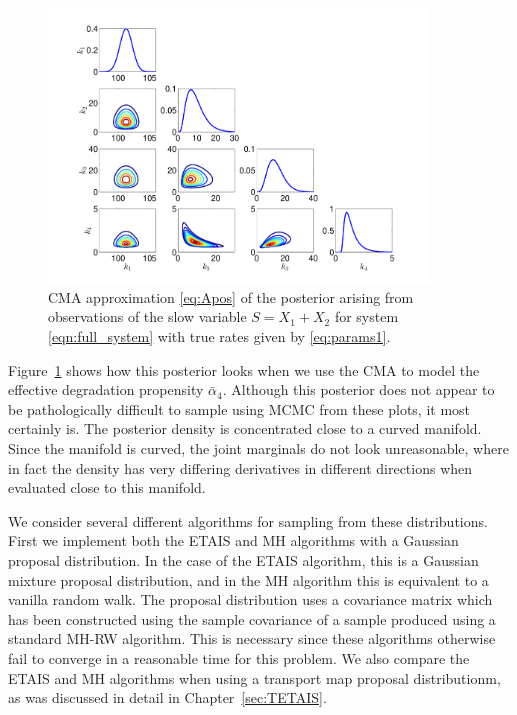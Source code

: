\documentclass[final]{siamltex}
\begin{document}
\begin{figure}[htb]
\centering
\includegraphics[width=0.9\textwidth]{"images/Applications/CMA_posterior"}
\caption{CMA approximation \eqref{eq:Apos} of the posterior arising from observations of
  the slow variable $S = X_1 + X_2$ for system
  \eqref{eqn:full_system}  with true rates given by \eqref{eq:params1}.}
\label{fig:chem_CMA_posterior}
\end{figure}

Figure~\ref{fig:chem_CMA_posterior} shows how this posterior looks
when we use the CMA to model the effective degradation propensity
$\bar{\alpha}_4$. Although this posterior does not appear to be
pathologically difficult to sample using MCMC from these plots, it most certainly is. The posterior
density is concentrated close to a curved manifold. Since the manifold
is curved, the joint marginals do not look unreasonable, where in fact
the density has very differing derivatives in different directions
when evaluated close to this manifold.

We consider several different algorithms for sampling from these
distributions. First we implement both the ETAIS and MH algorithms with
a Gaussian proposal distribution. In the case of the ETAIS algorithm,
this is a Gaussian mixture proposal distribution, and in the MH
algorithm this is equivalent to a vanilla random walk. The proposal
distribution uses a covariance matrix which has been constructed using
the sample covariance of a sample produced using a standard MH-RW
algorithm. This is necessary since these algorithms otherwise fail to
converge in a reasonable time for
this problem. We also compare the ETAIS and MH algorithms when using a
transport map proposal distributionm, as was discussed in detail in Chapter~\ref{sec:TETAIS}.
\end{document}
